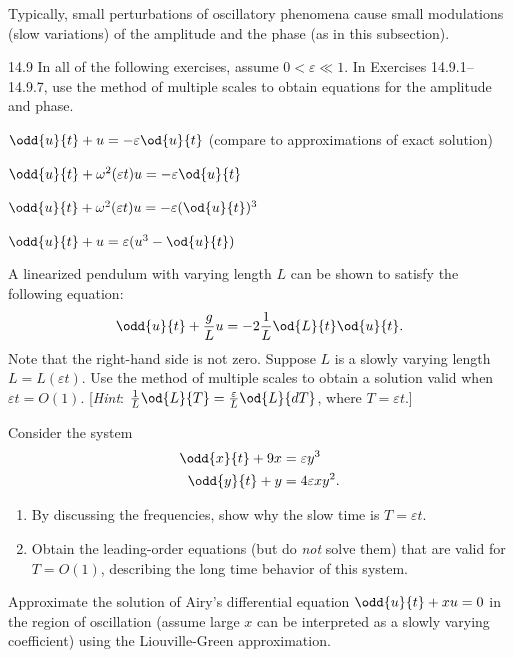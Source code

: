 Typically, small perturbations of oscillatory phenomena cause small modulations (slow variations) of the amplitude and the phase (as in this subsection).

\begin{exercises}{14.9}
In all of the following exercises, assume $0 < \varepsilon \ll 1$. In Exercises 14.9.1--14.9.7, use the method of multiple scales to obtain equations for the amplitude and phase.

\item $\odd{u}{t} + u = -\varepsilon\od{u}{t}$ (compare to approximations of exact solution)

\item $\odd{u}{t} + \omega^2(\varepsilon t)u = -\varepsilon\od{u}{t}$

\item[\starred] $\odd{u}{t} + \omega^2(\varepsilon t)u = -\varepsilon(\od{u}{t})^3$

\item $\odd{u}{t} + u = \varepsilon(u^3 - \od{u}{t})$

\item[\starred] A linearized pendulum with varying length $L$ can be shown to satisfy the following equation:
\[
\odd{u}{t} + \frac{g}{L}u = -2\frac{1}{L}\od{L}{t}\od{u}{t}.
\]
Note that the right-hand side is not zero. Suppose $L$ is a slowly varying length $L = L(\varepsilon t)$. Use the method of multiple scales to obtain a solution valid when $\varepsilon t = O(1)$. [\emph{Hint}: $\frac{1}{L}\od{L}{T} = \frac{\varepsilon}{L}\od{L}{dT}$, where $T = \varepsilon t$.]

\item Consider the system
\begin{align*}
\odd{x}{t} + 9x &= \varepsilon y^3 \\
\odd{y}{t} + y &= 4\varepsilon xy^2.
\end{align*}
\begin{enumerate}
\item[(a)] By discussing the frequencies, show why the slow time is $T = \varepsilon t$.
\item[(b)] Obtain the leading-order equations (but do \emph{not} solve them) that are valid for $T = O(1)$, describing the long time behavior of this system.
\end{enumerate}

\item Approximate the solution of Airy's differential equation $\odd{u}{t} + xu = 0$ in the region of oscillation (assume large $x$ can be interpreted as a slowly varying coefficient) using the Liouville-Green approximation.


\end{exercises}

